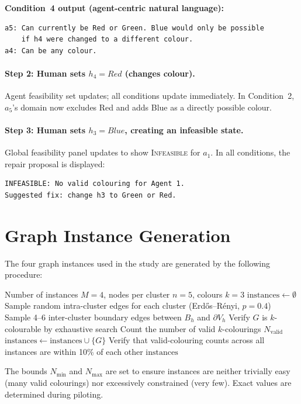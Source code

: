 \documentclass[10pt]{article}
\theoremstyle{definition}
\begin{document}
\noindent \textbf{Condition~4 output (agent-centric natural language):}
\begin{lstlisting}
a5: Can currently be Red or Green. Blue would only be possible
    if h4 were changed to a different colour.
a4: Can be any colour.
\end{lstlisting}

\paragraph{Step 2: Human sets $h_4 = \textit{Red}$ (changes colour).}
Agent feasibility set updates; all conditions update immediately.  In Condition~2, $a_5$'s domain
now excludes Red and adds Blue as a directly possible colour.

\paragraph{Step 3: Human sets $h_3 = \textit{Blue}$, creating an infeasible state.}
Global feasibility panel updates to show \textsc{Infeasible} for $a_1$.  In all conditions, the
repair proposal is displayed:
\begin{lstlisting}
INFEASIBLE: No valid colouring for Agent 1.
Suggested fix: change h3 to Green or Red.
\end{lstlisting}

\section{Graph Instance Generation}
\label{app:graphs}

The four graph instances used in the study are generated by the following procedure:

\begin{algorithm}
\caption{GenerateMatchedGraphInstances}
\label{alg:graphgen}
\begin{algorithmic}[1]
\REQUIRE Number of instances $M=4$, nodes per cluster $n=5$, colours $k=3$
\STATE $\mathrm{instances} \gets \emptyset$
  \STATE Sample random intra-cluster edges for each cluster (Erd\H{o}s--R\'{e}nyi, $p=0.4$)
  \STATE Sample 4--6 inter-cluster boundary edges between $B_h$ and $\partial V_h$
  \STATE Verify $G$ is $k$-colourable by exhaustive search
  \STATE Count the number of valid $k$-colourings $N_{\mathrm{valid}}$
    \STATE $\mathrm{instances} \gets \mathrm{instances} \cup \{G\}$
  \ENDIF
\ENDWHILE
\STATE Verify that valid-colouring counts across all instances are within 10\% of each other
\RETURN $\mathrm{instances}$
\end{algorithmic}
\end{algorithm}

The bounds $N_{\min}$ and $N_{\max}$ are set to ensure instances are neither trivially easy
(many valid colourings) nor excessively constrained (very few).  Exact values are determined
during piloting.
\end{document}
